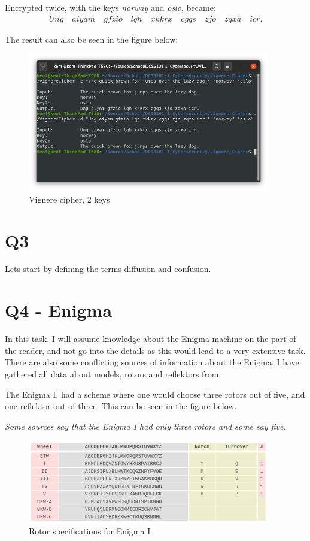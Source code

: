\documentclass{article}
\begin{document}
Encrypted twice, with the keys \textit{norway} and \textit{oslo}, became:
\begin{align*}
Ung\quad aiyam\quad gfzio\quad lqh\quad xkkrx\quad cgqs\quad zjo\quad zqxa\quad icr.
\end{align*}

The result can also be seen in the figure below:
\begin{figure}[H]
 \centering
  \includegraphics[width=300pt]{img/vignere2keys.png}
 \caption{Vignere cipher, 2 keys}
 \end{figure}

\section{Q3}
Lets start by defining the terms diffusion and confusion.
\section{Q4 - Enigma}

In this task, I will assume knowledge about the Enigma machine on the part of the reader, and not go into the details as this would lead to a very extensive task. There are also some conflicting sources of information about the Enigma. I have gathered all data about models, rotors and reflektors from \cite{ENIGMA1} \cite{ENIGMA2}

The Enigma I, had a scheme where one would choose three rotors out of five, and one reflektor out of three. This can be seen in the figure below. 

\textit{Some sources say that the Enigma I had only three rotors and some say five.}

\begin{figure}[H]
 \centering
  \includegraphics[width=300pt]{img/enigmaIspecs.png}
 \caption{Rotor specifications for Enigma I}
 \end{figure}
\end{document}
